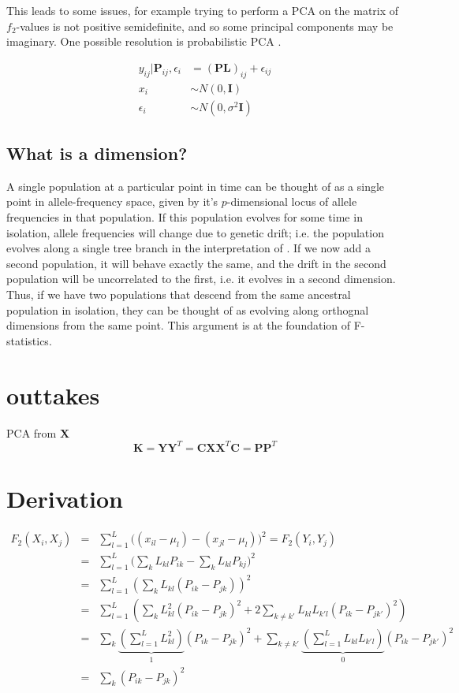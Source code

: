 \documentclass[10pt,a4paper]{article}
\newcommand{\MX}{\mathbf{X}} %
\newcommand{\MC}{\mathbf{C}} %
\newcommand{\MY}{\mathbf{Y}} %
\newcommand{\MP}{\mathbf{P}} %
\newcommand{\ML}{\mathbf{L}} %
\newcommand{\MK}{\mathbf{K}} %
\begin{document}
	This leads to some issues, for example trying to perform a PCA on the matrix of $f_2$-values is not positive semidefinite, and so some principal components may be imaginary. One possible resolution is probabilistic PCA \citep[e.g.][]{engelhardt2010,agrawal2020}.
	
	\begin{align}
	    y_{ij} | \MP_{ij}, \epsilon_i &= (\MP\ML)_{ij} + \epsilon_{ij}\nonumber\\
	    x_i & \sim N(0, \mathbf{I}) \nonumber\\
	    \epsilon_i &\sim N(0, \sigma^2 \mathbf{I})\nonumber
	\end{align}
	
	\subsection{What is a dimension?}
	A single population at a particular point in time can be thought of as a single point in allele-frequency space, given by it's $p$-dimensional locus of allele frequencies in that population. If this population evolves for some time in isolation, allele frequencies will change due to genetic drift; i.e. the population evolves along a single tree branch in the interpretation of \cite{patterson2012}. If we now add a second population, it will behave exactly the same, and the drift in the second population will be uncorrelated to the first, i.e. it evolves in a second dimension. Thus, if we have two populations that descend from the same ancestral population in isolation, they can be thought of as evolving along orthognal dimensions from the same point. This argument is at the foundation of F-statistics.
	
	
	\section{outtakes}
	PCA from $\MX$
	\begin{equation}
	\MK = \MY \MY^T = \MC\MX\MX^T \MC = \MP\MP^T
	\end{equation}

\appendix
\section{Derivation}\label{appendix:fonpc}
\begin{eqnarray}
F_2(X_i, X_j) &=& \sum_{l=1}^L \big( (x_{il} - \mu_l) -(x_{jl} -\mu_l)\big)^2 = F_2(Y_i, Y_j)\nonumber\\
&=& \sum_{l=1}^L \big( \sum_k L_{kl}P_{ik} - \sum_kL_{kl}P_{kj}\big)^2\nonumber\\
&=& \sum_{l=1}^L \left( \sum_k L_{kl} (P_{ik} -P_{jk}) \right)^2\nonumber\\
&=& \sum_{l=1}^L \left( \sum_k L_{kl}^2 (P_{ik} -P_{jk})^2 + 2\sum_{k\neq k'} L_{kl}L_{k'l}(P_{ik} - P_{jk'})^2 \right)\nonumber\\
&=& \sum_k \underbrace{\left(\sum_{l=1}^L L_{kl}^2\right)}_1 (P_{ik} -P_{jk})^2 + \sum_{k\neq k'}\underbrace{\left(\sum_{l=1}^L L_{kl}L_{k'l}\right)}_{0} (P_{ik} - P_{jk'})^2\nonumber\\
&=& \sum_k (P_{ik} - P_{jk})^2
\end{eqnarray}
\end{document}
